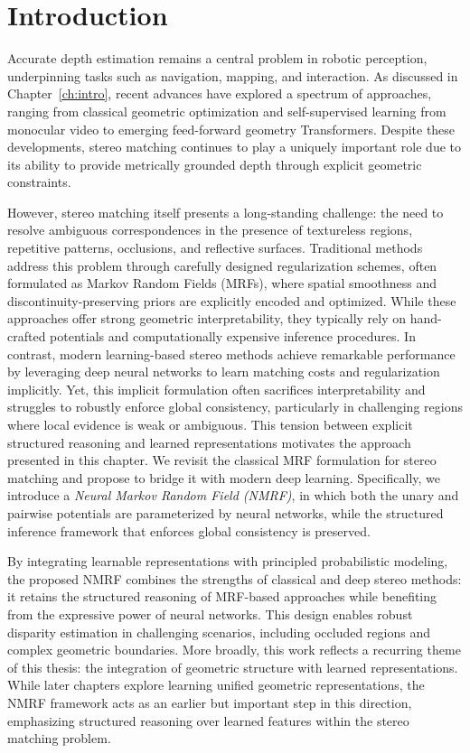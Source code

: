 \section{Introduction}
Accurate depth estimation remains a central problem in robotic perception, underpinning tasks such as navigation, mapping, and interaction.
As discussed in Chapter~\ref{ch:intro}, recent advances have explored a spectrum of approaches, ranging from classical geometric optimization and self-supervised learning from monocular video to emerging feed-forward geometry Transformers.
Despite these developments, stereo matching continues to play a uniquely important role due to its ability to provide metrically grounded depth through explicit geometric constraints.

However, stereo matching itself presents a long-standing challenge: the need to resolve ambiguous correspondences in the presence of textureless regions, repetitive patterns, occlusions, and reflective surfaces.
Traditional methods address this problem through carefully designed regularization schemes, often formulated as Markov Random Fields (MRFs), where spatial smoothness and discontinuity-preserving priors are explicitly encoded and optimized.
While these approaches offer strong geometric interpretability, they typically rely on hand-crafted potentials and computationally expensive inference procedures.
In contrast, modern learning-based stereo methods achieve remarkable performance by leveraging deep neural networks to learn matching costs and regularization implicitly.
Yet, this implicit formulation often sacrifices interpretability and struggles to robustly enforce global consistency, particularly in challenging regions where local evidence is weak or ambiguous. 
This tension between explicit structured reasoning and learned representations motivates the approach presented in this chapter. 
We revisit the classical MRF formulation for stereo matching and propose to bridge it with modern deep learning.
Specifically, we introduce a \emph{Neural Markov Random Field (NMRF)}, in which both the unary and pairwise potentials are parameterized by neural networks, while the structured inference framework that enforces global consistency is preserved.

By integrating learnable representations with principled probabilistic modeling, the proposed NMRF combines the strengths of classical and deep stereo methods: it retains the structured reasoning of MRF-based approaches while benefiting from the expressive power of neural networks.
This design enables robust disparity estimation in challenging scenarios, including occluded regions and complex geometric boundaries.
More broadly, this work reflects a recurring theme of this thesis: the integration of geometric structure with learned representations.
While later chapters explore learning unified geometric representations, the NMRF framework acts as an earlier but important step in this direction, emphasizing structured reasoning over learned features within the stereo matching problem.

